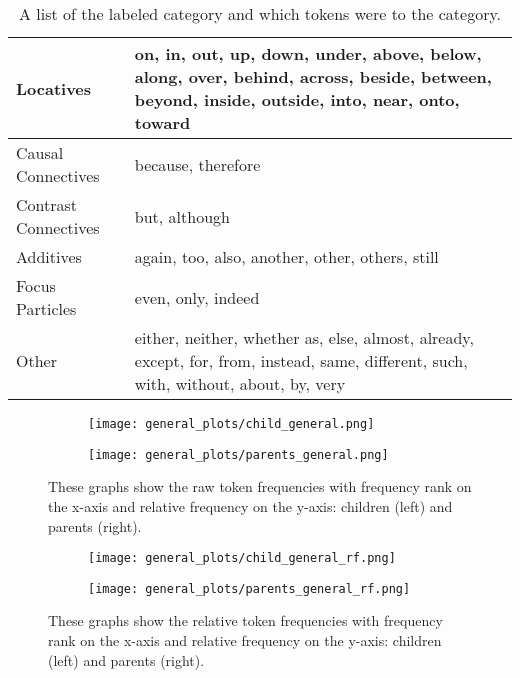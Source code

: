 \documentclass{article}
\theoremstyle{plain}
\theoremstyle{definition}
\theoremstyle{remark}
\numberwithin{equation}{section}
\begin{document}
\begin{table}[H]
{\begin{tabular}[width=\textwidth]{|p{8cm}|p{8cm}|}
                \hline
        Locatives & on, in, out, up, down, under, above, below, along, over, behind, across, beside, between, beyond, inside, outside, into, near, onto, toward\\
                \hline
        Causal Connectives & because, therefore\\
                \hline
        Contrast Connectives & but, although\\
                \hline
        Additives & again, too, also, another, other, others, still\\
                \hline
        Focus Particles & even, only, indeed\\
                \hline
        Other & either, neither, whether as, else, almost, already, except, for, from, instead, same, different, such, with, without, about, by, very\\
                \hline
    \end{tabular}}
    \caption{A list of the labeled category and which tokens were to the category.}
    \label{Tab:category}
    \end{table}

\begin{figure}[H]
\begin{subfigure}[b]{0.5\textwidth}
    \centering
    \texttt{[image: general\_plots/child\_general.png]}
\caption{}
    \label{fig:child_raw}
\end{subfigure}
\hfill
\begin{subfigure}[b]{0.5\textwidth}
\centering
    \texttt{[image: general\_plots/parents\_general.png]}
\caption{}
    \label{fig:parent_raw}
\end{subfigure}
   \caption{These graphs show the raw token frequencies with frequency rank on the x-axis and relative frequency on the y-axis: children (left) and parents (right).}
    \label{fig:general_raw}
\end{figure}

\begin{figure}[H]
\begin{subfigure}[b]{0.5\textwidth}
    \centering
    \texttt{[image: general\_plots/child\_general\_rf.png]}
\caption{}
    \label{fig:child_rf}
\end{subfigure}
\hfill
\begin{subfigure}[b]{0.5\textwidth}
\centering
    \texttt{[image: general\_plots/parents\_general\_rf.png]}
\caption{}
    \label{fig:parent_rf}
\end{subfigure}
   \caption{These graphs show the relative token frequencies with frequency rank on the x-axis and relative frequency on the y-axis: children (left) and parents (right).}
    \label{fig:general_rf}
\end{figure}
\end{document}
